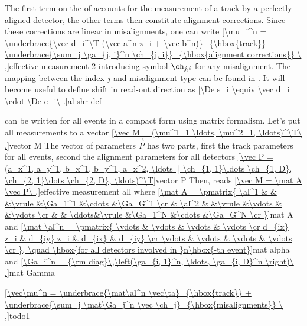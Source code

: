 The first term on the \rhs{} of  accounts for the measurement of a track by a perfectly aligned detector, the other terms then constitute alignment corrections. Since these corrections are linear in misalignments, one can write
\eqref{\mu_i^n =
\underbrace{\vec d_i^\T (\vec a^n z_i + \vec b^n)}_{\hbox{track}}
+
\underbrace{\sum_j \ga_{j, i}^n \ch_{j, i}}_{\hbox{alignment corrections}}
\ ,}{effective measurement 2}
introducing symbol $\ch_{j, i}$ for any misalignment. The mapping between the index $j$ and misalignment type can be found in . It will become useful to define shift in read-out direction as
\eqref{\De s_i \equiv \vec d_i \cdot \De c_i\ .}{al shr def}


 can be written for all events in a compact form using matrix formalism. Let's put all measurements to a vector
\eqref{\vec M = (\mu^1_1 \ldots, \mu^2_1, \ldots)^\T\ .}{vector M}
The vector of parameters $\vec P$ has two parts, first the track parameters for all events, second the alignment parameters for all detectors
\eqref{\vec P = (a_x^1, a_y^1, b_x^1, b_y^1, a_x^2, \ldots || \ch_{1, 1}\ldots \ch_{1, D}, \ch_{2, 1}\dots \ch_{2, D}, \ldots)^\T}{vector P}
Then,  reads
\eqref{\vec M = \mat A \vec P\ ,}{effective measurement all}
where
\eqref{\mat A = \pmatrix{
\al^1 & 		&		&\vrule	&\Ga_1^1	&\cdots	&\Ga_G^1	\cr
	& \al^2	&		&\vrule	&\vdots		&		&\vdots		\cr
	&		& \ddots&\vrule	&\Ga_1^N	&\cdots	&\Ga_G^N	\cr
}}{mat A}
and
\eqref{\mat \al^n = \pmatrix{
\vdots & \vdots & \vdots & \vdots \cr
d_{ix} z_i & d_{iy} z_i & d_{ix} & d_{iy} \cr
\vdots & \vdots & \vdots & \vdots \cr
}, \quad \hbox{for all detectors involved in }n\hbox{-th event}}{mat alpha}
and
\eqref{\Ga_i^n = {\rm diag}\,\left(\ga_{i, 1}^n, \ldots, \ga_{i, D}^n \right)\ .}{mat Gamma}


\eqref{\vec\mu^n =
\underbrace{\mat\al^n \vec\ta}_{\hbox{track}}
+
\underbrace{\sum_j \mat\Ga_j^n \vec \ch_j}_{\hbox{misalignments}}
\ ,}{todo1}

